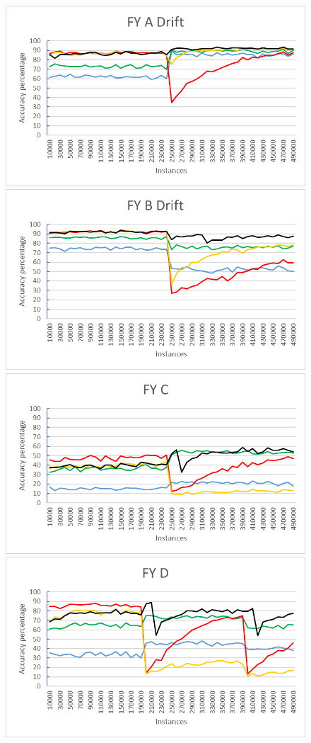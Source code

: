 \begin{figure}[h]
\centering 
\includegraphics[scale=0.25]{Graphs/FeatureDrift/FY_A_Drift}
\includegraphics[scale=0.25]{Graphs/FeatureDrift/FY_B_Drift}
\includegraphics[scale=0.25]{Graphs/FeatureDrift/FY_C}
\includegraphics[scale=0.25]{Graphs/FeatureDrift/FY_D}

\end{figure}
